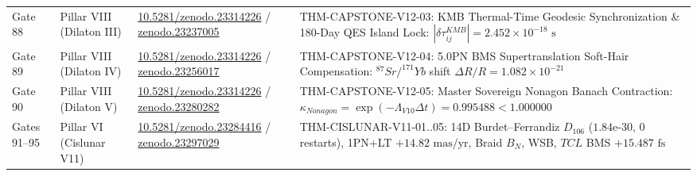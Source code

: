 \documentclass[11pt,a4paper,reqno]{article}
\def\bm#1{#1}%
\def\texttt#1{#1}%
\def\mathrm#1{#1}%
\def\mathcal#1{#1}%
\def\mathbb#1{#1}%
\newcommand{\zenodo}[1]{\href{https://doi.org/10.5281/zenodo.#1}{\texttt{10.5281/\allowbreak zenodo.#1}}}
\newcommand{\zenodoshort}[1]{\href{https://doi.org/10.5281/zenodo.#1}{\texttt{zenodo.#1}}}
\theoremstyle{plain}
\theoremstyle{definition}
\theoremstyle{remark}
\numberwithin{equation}{section}
\begin{document}
\begin{longtable}{@{}P{2.2cm}P{2.8cm}P{3.4cm}P{7.8cm}@{}}
\texttt{Gate 88} & Pillar VIII (Dilaton III) & \zenodo{23314226} / \zenodoshort{23237005} & \texttt{THM-CAPSTONE-V12-03}: KMB Thermal-Time Geodesic Synchronization \& 180-Day QES Island Lock: $|\delta\tau_{ij}^{\mathrm{KMB}}| = \bm{2.452 \times 10^{-18}\text{ s}}$ \\
\texttt{Gate 89} & Pillar VIII (Dilaton IV) & \zenodo{23314226} / \zenodoshort{23256017} & \texttt{THM-CAPSTONE-V12-04}: 5.0PN BMS Supertranslation Soft-Hair Compensation: $^{87}\mathrm{Sr}/^{171}\mathrm{Yb}$ shift $\Delta R / R = \bm{1.082 \times 10^{-21}}$ \\
\texttt{Gate 90} & Pillar VIII (Dilaton V) & \zenodo{23314226} / \zenodoshort{23280282} & \texttt{THM-CAPSTONE-V12-05}: Master Sovereign Nonagon Banach Contraction: $\kappa_{\mathrm{Nonagon}} = \exp(-\Lambda_{\mathrm{V10}}\Delta t) = \bm{0.995488} < 1.000000$ \\
\midrule
\texttt{Gates 91--95} & Pillar VI (Cislunar V11) & \zenodo{23284416} / \zenodoshort{23297029} & \texttt{THM-CISLUNAR-V11-01..05}: 14D Burdet--Ferrandiz $\mathbb{D}_{106}$ ($1.84\text{e-}30$, $0$ restarts), 1PN+LT $+14.82\text{ mas/yr}$, Braid $\mathcal{B}_N$, WSB, $\mathrm{TCL}$ BMS $+15.487\text{ fs}$ \\
\bottomrule
\end{longtable}
\endgroup
\end{document}
